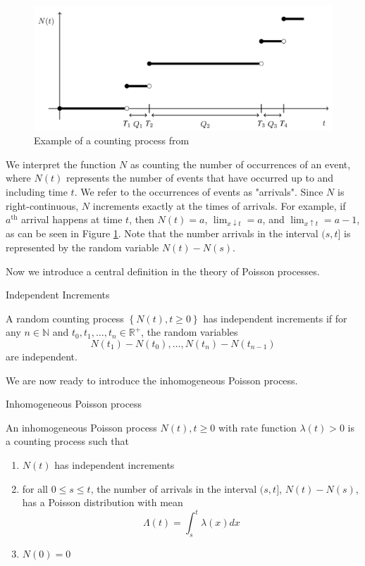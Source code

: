 \begin{figure}[h]
	\centering
	\includegraphics[width=\textwidth]{./figures/poisson_process_example.png}
	\caption{Example of a counting process from \cite{countingProcessFigure}}
	\label{fig:poissonProcessExample}
\end{figure}

We interpret the function $N$ as counting the number of occurrences of an event, where $N(t)$ represents the number of events that have occurred up to and including time $t$. We refer to the occurrences of events as "arrivals".  Since $N$ is right-continuous, $N$ increments exactly at the times of arrivals. For example, if $a^\text{th}$ arrival happens at time $t$, then $N(t) = a$, $\lim_{x \downarrow t} = a$, and $\lim_{x \uparrow t} = a - 1$, as can be seen in Figure \ref{fig:poissonProcessExample}. Note that the number arrivals in the interval $(s, t]$ is represented by the random variable $N(t) - N(s)$. 

Now we introduce a central definition in the theory of Poisson processes.

\begin{definition}
	Independent Increments

	A random counting process $\left\{ N(t), t \geq 0 \right\}$ has independent increments if for any $n \in \mathbb{N}$ and $t_0, t_1, \dots, t_n \in \mathbb{R}^{+}$,
	the random variables
	$$
		N(t_1) - N(t_0), \dots, N(t_n) - N(t_{n - 1})
	$$
	are independent.
\end{definition}

We are now ready to introduce the inhomogeneous Poisson process.

\begin{definition}
	Inhomogeneous Poisson process

	\noindent
	An inhomogeneous Poisson process ${N(t), t \geq 0}$ with rate function $\lambda(t) > 0$ is a counting process such that
	\begin{enumerate}
		\item $N(t)$ has independent increments
		\item for all $0 \leq s \leq t$, 
		the number of arrivals in the interval $(s, t]$, 
		$N(t) - N(s)$, has a Poisson distribution with mean
		$$
			\Lambda(t) = \int_s^t \lambda(x) dx
		$$
		\item $N(0) = 0$
	\end{enumerate}
\end{definition}


